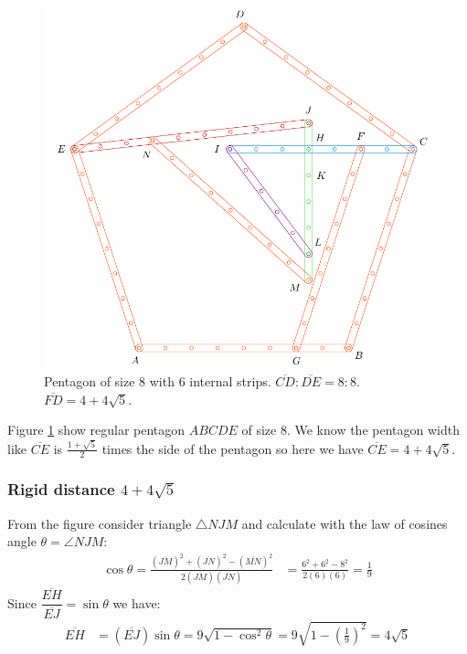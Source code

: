 \documentclass[11pt]{article}
\begin{document}
\begin{figure}[H]
\centering
\includegraphics[scale=0.8]{8/penta8-6a}
\caption{Pentagon of size 8 with 6 internal strips. $\overline{CD} : \overline{DE} = 8:8$. $\overline{FD} = 4 + 4\sqrt5$.}
\label{fig:penta8-6a}
\end{figure}

Figure \ref{fig:penta8-6a} show regular pentagon $ABCDE$ of size 8. We know the pentagon width like $\overline{CE}$ is $\frac{1+\sqrt5}2$ times the side of the pentagon so here we have $\overline{CE} = 4+4\sqrt5$.

\subsubsection{Rigid distance $4 + 4\sqrt5$}

From the figure consider triangle $\triangle{NJM}$ and calculate with the law of cosines angle $\theta = \angle{NJM}$:
\begin{align}
\cos\theta = \frac{(\overline{JM})^2 + (\overline{JN})^2 
 - (\overline{MN})^2}{2(\overline{JM})(\overline{JN})}
 &= \frac{6^2 + 6^2 - 8^2}{2(6)(6)} = \frac{1}9
\end{align}
Since $\dfrac{\overline{EH}}{\overline{EJ}} = \sin\theta$ we have:
\begin{align}
\overline{EH} &= (\overline{EJ})\sin\theta
 = 9\sqrt{1-\cos^2\theta} 
 = 9\sqrt{1-\left(\frac{1}9\right)^2} = 4\sqrt5
\end{align}
\end{document}
